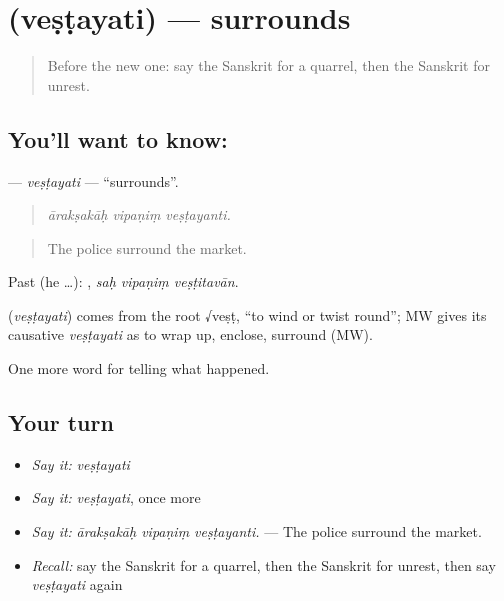 \section[\texorpdfstring{\sk{वेष्टयति} (veṣṭayati)}{वेष्टयति (veṣṭayati)}]{ (veṣṭayati) — surrounds}

\label{lesson:SA-C313-vestayati}



\begin{quote}
Before the new one: say the Sanskrit for a quarrel, then the Sanskrit for unrest.
\end{quote}

\subsection*{You'll want to know: }
\textbf{} — \emph{veṣṭayati} — \textquotedblleft{}surrounds\textquotedblright{}.

\begin{quote}
  
\end{quote}

\begin{quote}
\emph{ārakṣakāḥ vipaṇiṃ veṣṭayanti.}
\end{quote}

\begin{quote}
The police surround the market.
\end{quote}

Past (he …):   , \emph{saḥ vipaṇiṃ veṣṭitavān}.

\begin{cousinweb}
\textbf{} (\emph{veṣṭayati}) comes from the root √veṣṭ, \textquotedblleft{}to wind or twist round\textquotedblright{}; MW gives its causative \emph{veṣṭayati} as to wrap up, enclose, surround (MW).
\end{cousinweb}

\begin{grammarlens}[title={What you've built}]
One more word for telling what happened.
\end{grammarlens}

\subsection*{Your turn}
\begin{itemize}
\raggedright
  \item \emph{Say it:} \emph{veṣṭayati}
  \item \emph{Say it:} \emph{veṣṭayati}, once more
  \item \emph{Say it:} \emph{ārakṣakāḥ vipaṇiṃ veṣṭayanti.} — The police surround the market.
  \item \emph{Recall:} say the Sanskrit for a quarrel, then the Sanskrit for unrest, then say \emph{veṣṭayati} again
\end{itemize}


